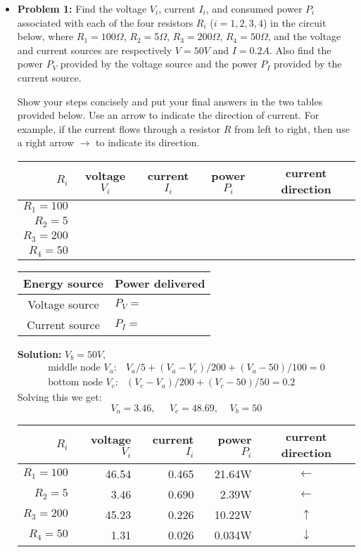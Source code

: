 \begin{itemize} 

\item {\bf Problem 1:}
  Find the voltage $V_i$, current $I_i$, and consumed power $P_i$ associated with 
  each of the four resistors $R_i$ ($i=1,2,3,4$) in the circuit below, where 
  $R_1=100\Omega$, $R_2=5\Omega$, $R_3=200\Omega$, $R_4=50\Omega$, and the 
  voltage and current sources are respectively $V=50V$ and $I=0.2A$. Also find
  the power $P_V$ provided by the voltage source and the power $P_I$ provided 
  by the current source.


  Show your steps concisely and put your final answers in the two tables provided
  below. Use an arrow to indicate the direction of current. For example, if the
  current flows through a resistor $R$ from left to right, then use a right arrow
  $\rightarrow$ to indicate its direction.

  \begin{tabular}{r|c|c|c|c}\hline
    $R_i$     & voltage $V_i$ & current $I_i$ & power $P_i$ & current direction \\ \hline
    $R_1=100$ &       &      &                    \\
    $R_2=  5$ &       &      &                    \\
    $R_3=200$ &       &      &                    \\
    $R_4= 50$ &       &      &                    \\ \hline
  \end{tabular}

  \begin{tabular}{c|l}\hline
    Energy source  & Power delivered \\ \hline
    Voltage source & $P_V=$    \\
    Current source & $P_I=$    \\ \hline
  \end{tabular}

  
  {\bf Solution:} 
  $V_b=50V$, 
  \[ \begin{array}{ll}
    \mbox{middle node $V_a$:} & V_a/5+(V_a-V_c)/200+(V_a-50)/100=0 \\
    \mbox{bottom node $V_c$:} & (V_c-V_a)/200+(V_c-50)/50=0.2 \end{array} 
  \]
  Solving this we get: 
  \[ V_a=3.46,\;\;\;\;\;V_c=48.69,\;\;\;\;V_b=50 \]

  \begin{tabular}{r|r|r|r|c}\hline
    $R_i$ & voltage $V_i$ & current $I_i$ & power $P_i$ & current direction \\ \hline
    $R_1=100$ & 46.54 & 0.465 &  21.64W & $\leftarrow$   \\
    $R_2=  5$ &  3.46 & 0.690 &   2.39W & $\leftarrow$   \\
    $R_3=200$ & 45.23 & 0.226 &  10.22W & $\uparrow$     \\
    $R_4= 50$ &  1.31 & 0.026 &  0.034W & $\downarrow$   \\ \hline
  \end{tabular}


\end{itemize}
